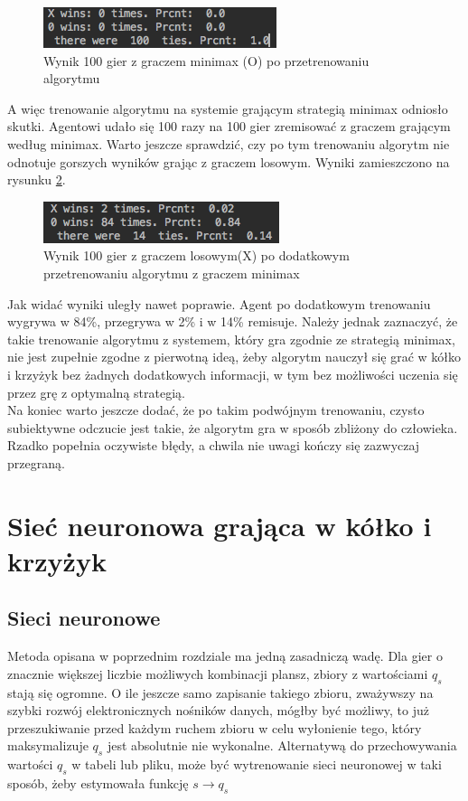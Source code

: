 \documentclass[licencjacka]{pracamgr}
\begin{document}
\begin{figure}[h!]
	\includegraphics [scale=0.7]{QTable_vs_Minimax_trained_d.png}
	\caption{Wynik 100 gier z graczem minimax (O) po przetrenowaniu algorytmu}
	\label{Rys18}
\end{figure}

A więc trenowanie algorytmu na systemie grającym strategią minimax odniosło skutki.  Agentowi udało się 100 razy na 100 gier zremisować z graczem grającym według minimax. Warto jeszcze sprawdzić, czy po tym trenowaniu algorytm nie odnotuje gorszych wyników grając z graczem losowym. Wyniki zamieszczono na rysunku \ref{Rys19}.\\

\begin{figure}[h!]
	\includegraphics [scale=0.7]{QTable_vs_Rnd_trained_d.png}
	\caption{Wynik 100 gier z graczem losowym(X) po dodatkowym przetrenowaniu algorytmu z graczem minimax}
	\label{Rys19}
\end{figure}

Jak widać wyniki uległy nawet poprawie. Agent po dodatkowym trenowaniu wygrywa w 84\%, przegrywa w 2\% i w 14\% remisuje. Należy jednak zaznaczyć, że takie trenowanie algorytmu z systemem, który gra zgodnie ze strategią minimax, nie jest zupełnie zgodne z pierwotną ideą, żeby algorytm nauczył się grać w kółko i krzyżyk bez żadnych dodatkowych informacji, w tym bez możliwości uczenia się przez grę z optymalną strategią. \\

Na koniec warto jeszcze dodać, że po takim podwójnym trenowaniu, czysto subiektywne odczucie jest takie, że algorytm gra w sposób zbliżony do człowieka. Rzadko popełnia oczywiste błędy, a chwila nie uwagi kończy się zazwyczaj przegraną. 

 
\chapter{Sieć neuronowa grająca w kółko i krzyżyk }\label{r:Siec}

\section{Sieci neuronowe}
Metoda opisana w poprzednim rozdziale ma jedną zasadniczą wadę. Dla gier o znacznie większej liczbie możliwych kombinacji plansz, zbiory z wartościami $q_{s}$ stają się ogromne. O ile jeszcze samo zapisanie takiego zbioru, zważywszy na szybki rozwój elektronicznych nośników danych, mógłby być możliwy, to już przeszukiwanie przed każdym ruchem zbioru w celu wyłonienie tego, który maksymalizuje $q_{s}$ jest absolutnie nie wykonalne. Alternatywą do przechowywania wartości $q_{s}$ w tabeli lub pliku, może być wytrenowanie sieci neuronowej w taki sposób, żeby estymowała funkcję $s\rightarrow q_{s}$\\
\end{document}
